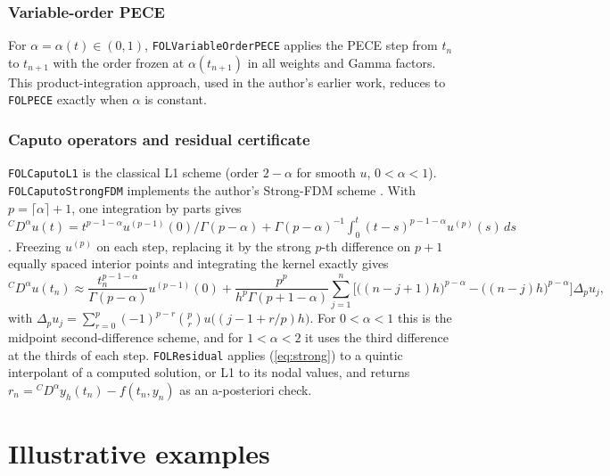 \documentclass[11pt]{article}
\begin{document}
\subsubsection{Variable-order PECE}
For $\alpha=\alpha(t)\in(0,1)$, \texttt{FOLVariableOrderPECE} applies the PECE step from $t_n$ to $t_{n+1}$ with the order frozen at $\alpha(t_{n+1})$ in all weights and Gamma factors. This product-integration approach, used in the author's earlier work, reduces to \texttt{FOLPECE} exactly when $\alpha$ is constant.

\subsubsection{Caputo operators and residual certificate}
\texttt{FOLCaputoL1} is the classical L1 scheme (order $2-\alpha$ for smooth $u$, $0<\alpha<1$). \texttt{FOLCaputoStrongFDM} implements the author's Strong-FDM scheme \cite{salasstrong}. With $p=\lceil\alpha\rceil+1$, one integration by parts gives
${}^{C}\!D^{\alpha}u(t)=t^{p-1-\alpha}u^{(p-1)}(0)/\Gamma(p-\alpha)+\Gamma(p-\alpha)^{-1}\int_0^t(t-s)^{p-1-\alpha}u^{(p)}(s)\,ds$.
Freezing $u^{(p)}$ on each step, replacing it by the strong $p$-th difference on $p+1$ equally spaced interior points and integrating the kernel exactly gives
\begin{equation}\label{eq:strong}
{}^{C}\!D^{\alpha}u(t_n)\approx\frac{t_n^{p-1-\alpha}}{\Gamma(p-\alpha)}u^{(p-1)}(0)+\frac{p^{p}}{h^{p}\Gamma(p+1-\alpha)}\sum_{j=1}^{n}\Big[\big((n-j+1)h\big)^{p-\alpha}-\big((n-j)h\big)^{p-\alpha}\Big]\Delta_p u_j,
\end{equation}
with $\Delta_p u_j=\sum_{r=0}^{p}(-1)^{p-r}\binom{p}{r}u\big((j-1+r/p)h\big)$. For $0<\alpha<1$ this is the midpoint second-difference scheme, and for $1<\alpha<2$ it uses the third difference at the thirds of each step. \texttt{FOLResidual} applies (\ref{eq:strong}) to a quintic interpolant of a computed solution, or L1 to its nodal values, and returns $r_n={}^{C}\!D^{\alpha}y_h(t_n)-f(t_n,y_n)$ as an a-posteriori check.

\section{Illustrative examples}
\end{document}
